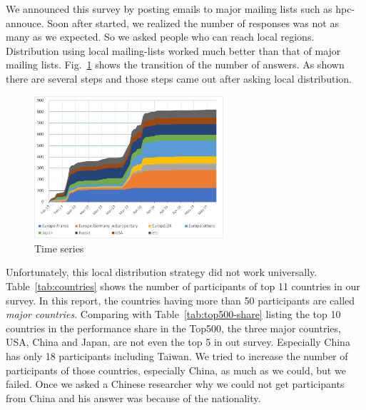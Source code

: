 \documentclass[conference,10pt,letterpaper]{IEEEtran}
\begin{document}
%
%
We announced this survey by posting emails to major mailing lists such
as hpc-annouce. Soon after started, we realized the number of
responses was not as many as we expected. So we asked people who can
reach local regions. Distribution using local mailing-lists worked
much better than that of major mailing
lists. Fig.~\ref{fig:time-series} shows the transition of the number
of answers. As shown there are several steps and those steps came out
after asking local distribution. 
%
\begin{figure}[htb]
\begin{center}
\includegraphics[width=7cm]{Figs/TimeSeries-Zoom.pdf}
\caption{Time series}
\label{fig:time-series}
\end{center}
\end{figure}
%
Unfortunately, this local distribution strategy did not work
universally. Table~\ref{tab:countries} shows the number of
participants of top 11 countries in our survey. In this report, the
countries having more than 50 participants are called {\it major
  countries}. 
Comparing with Table~\ref{tab:top500-share} listing the top 10
countries in the performance share in the Top500\cite{Top500}, the
three major countries, USA, China and Japan, are not even the top 5 in
out survey. Especially China has only 18 participants including
Taiwan. We tried to increase the number of participants of those
countries, especially China, as much as we could, but we failed. Once
we asked a Chinese researcher why we could not get participants from
China and his answer was because of the nationality. 
%
\end{document}
